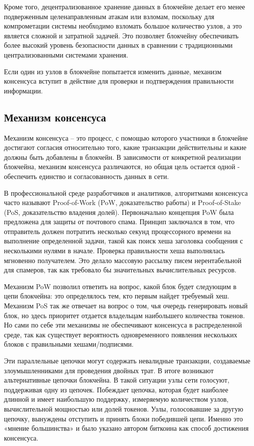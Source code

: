Кроме того, децентрализованное хранение данных в блокчейне делает его менее подверженным целенаправленным атакам или взломам, поскольку для компрометации системы необходимо взломать большое количество узлов, а это является сложной и затратной задачей. Это позволяет блокчейну обеспечивать более высокий уровень безопасности данных в сравнении с традиционными централизованными системами хранения.

Если один из узлов в блокчейне попытается изменить данные, механизм консенсуса вступит в действие для проверки и подтверждения правильности информации\cite{label9}.

\subsection{Механизм консенсуса}

Механизм консенсуса -- это процесс, с помощью которого участники в блокчейне достигают согласия относительно того, какие транзакции действительны и какие должны быть добавлены в блокчейн. В зависимости от конкретной реализации блокчейна, механизм консенсуса различаются, но общая цель остается одной - обеспечить единство и согласованность данных в сети.

В профессиональной среде разработчиков и аналитиков, алгоритмами консенсуса часто называют Proof-of-Work (PoW, доказательство работы) и Proof-of-Stake (PoS, доказательство владения долей)\cite{label18}. Первоначально концепция PoW была предложена для защиты от почтового спама. Принцип заключался в том, что отправитель должен потратить несколько секунд процессорного времени на выполнение определенной задачи, такой как поиск хеша заголовка сообщения с несколькими нулями в начале. Проверка правильности хеша выполнялась мгновенно получателем. Это делало массовую рассылку писем нерентабельной для спамеров, так как требовало бы значительных вычислительных ресурсов.

Механизм PoW позволил ответить на вопрос, какой блок будет следующим в цепи блокчейна: это определялось тем, кто первым найдет требуемый хеш. Механизм PoS так же отвечает на вопрос о том, чья очередь генерировать новый блок, но здесь приоритет отдается владельцам наибольшего количества токенов. Но сами по себе эти механизмы не обеспечивают консенсуса в распределенной среде, так как существует вероятность одновременного появления нескольких блоков с правильными хешами/подписями.

Эти параллельные цепочки могут содержать невалидные транзакции, создаваемые злоумышленниками для проведения двойных трат. В итоге возникают альтернативные цепочки блокчейна. В такой ситуации узлы сети голосуют, поддерживая одну из цепочек. Побеждает цепочка, которая будет наиболее длинной и имеет наибольшую поддержку, измеряемую количеством узлов, вычислительной мощностью или долей токенов. Узлы, голосовавшие за другую цепочку, вынуждены отступить и принять блоки победившей цепи. Именно это «мнение большинства» и было указано автором биткоина как способ достижения консенсуса\cite{label2}.

